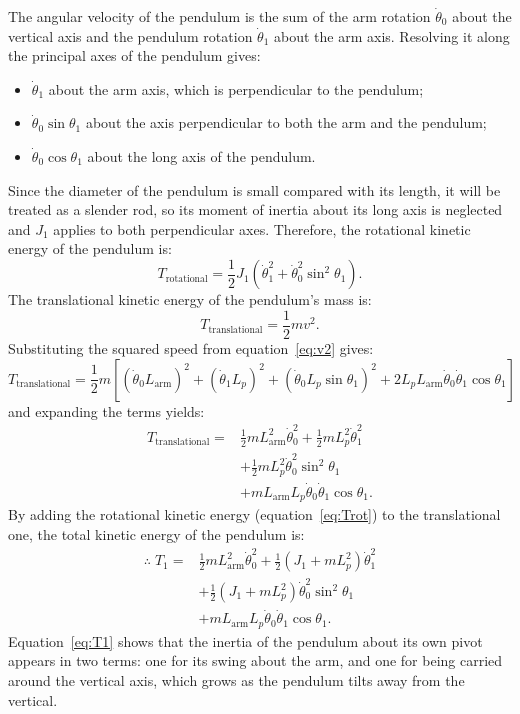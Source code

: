 \documentclass[a4paper,11pt]{article}
\newcommand{\La}{L_{\mathrm{arm}}}
\begin{document}
The angular velocity of the pendulum is the sum of the arm rotation $\dot\theta_0$ about the vertical axis and the pendulum rotation $\dot\theta_1$ about the arm axis. Resolving it along the principal axes of the pendulum gives:
\begin{itemize}
  \item $\dot\theta_1$ about the arm axis, which is perpendicular to the pendulum;
  \item $\dot\theta_0 \sin\theta_1$ about the axis perpendicular to both the arm and the pendulum;
  \item $\dot\theta_0 \cos\theta_1$ about the long axis of the pendulum.
\end{itemize}
Since the diameter of the pendulum is small compared with its length, it will be treated as a slender rod, so its moment of inertia about its long axis is neglected and $J_1$ applies to both perpendicular axes. Therefore, the rotational kinetic energy of the pendulum is:
\begin{equation}
  T_{\mathrm{rotational}} = \frac{1}{2} J_1 \left(\dot\theta_1^2 + \dot\theta_0^2 \sin^2\theta_1\right).
  \label{eq:Trot}
\end{equation}
The translational kinetic energy of the pendulum's mass is:
\begin{equation}
  T_{\mathrm{translational}} = \frac{1}{2} m v^2 .
\end{equation}
Substituting the squared speed from equation~\ref{eq:v2} gives:
\begin{equation}
  T_{\mathrm{translational}} = \frac{1}{2} m \left[\left(\dot\theta_0 \La\right)^2 + \left(\dot\theta_1 L_p\right)^2 + \left(\dot\theta_0 L_p \sin\theta_1\right)^2 + 2 L_p \La \dot\theta_0 \dot\theta_1 \cos\theta_1\right]
\end{equation}
and expanding the terms yields:
\begin{equation}
\begin{aligned}
  T_{\mathrm{translational}} = {}& \frac{1}{2} m \La^2 \dot\theta_0^2 + \frac{1}{2} m L_p^2 \dot\theta_1^2\\
  & + \frac{1}{2} m L_p^2 \dot\theta_0^2 \sin^2\theta_1\\
  & + m \La L_p \dot\theta_0 \dot\theta_1 \cos\theta_1 .
\end{aligned}
\end{equation}
By adding the rotational kinetic energy (equation~\ref{eq:Trot}) to the translational one, the total kinetic energy of the pendulum is:
\begin{equation}
\begin{aligned}
  \therefore\; T_1 = {}& \frac{1}{2} m \La^2 \dot\theta_0^2 + \frac{1}{2}\left(J_1 + m L_p^2\right)\dot\theta_1^2\\
  & + \frac{1}{2}\left(J_1 + m L_p^2\right)\dot\theta_0^2 \sin^2\theta_1\\
  & + m \La L_p \dot\theta_0 \dot\theta_1 \cos\theta_1 .
\end{aligned}
\label{eq:T1}
\end{equation}
Equation~\ref{eq:T1} shows that the inertia of the pendulum about its own pivot appears in two terms: one for its swing about the arm, and one for being carried around the vertical axis, which grows as the pendulum tilts away from the vertical.
\end{document}
